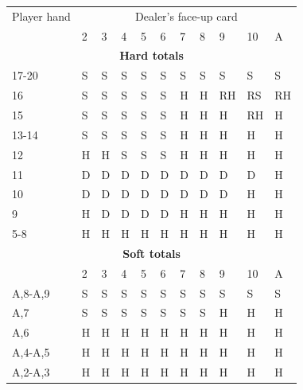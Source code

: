 \documentclass[conference]{IEEEtran}
\begin{document}
\begin{table}[ht]
\tiny
\centering
\begin{tabular}{|l|l|l|l|l|l|l|l|l|l|l|}
\hline

{Player hand} & \multicolumn{10}{c|}{Dealer's face-up card}     \\ \cline{2-11} 
                             & 2 & 3 & 4 & 5 & 6 & 7 & 8 & 9 & 10 & A \\ \hline
\multicolumn{11}{|c|}{\textbf{Hard totals}}                           \\ \hline
17-20       								 & S & S & S & S & S & S & S & S & S & S  \\ \hline
16                           & S & S & S & S & S & H & H & RH & RS & RH  \\ \hline
15                           & S & S & S & S & S & H & H & H & RH & H  \\ \hline
13-14                        & S & S & S & S & S & H & H & H & H & H  \\ \hline
12                           & H & H & S & S & S & H & H & H & H & H  \\ \hline
11                           & D & D & D & D & D & D & D & D & D & H  \\ \hline
10                           & D & D & D & D & D & D & D & D & H & H  \\ \hline
9                            & H & D & D & D & D & H & H & H & H & H  \\ \hline
5-8                          & H & H & H & H & H & H & H & H & H & H  \\ \hline

\multicolumn{11}{|c|}{\textbf{Soft totals}}                           \\ \hline
                             & 2 & 3 & 4 & 5 & 6 & 7 & 8 & 9 & 10 & A \\ \hline
A,8-A,9                      & S & S & S & S & S & S & S & S & S & S  \\ \hline
A,7                          & S & S & S & S & S & S & S & H & H & H  \\ \hline
A,6                          & H & H & H & H & H & H & H & H & H & H  \\ \hline
A,4-A,5                      & H & H & H & H & H & H & H & H & H & H  \\ \hline
A,2-A,3                      & H & H & H & H & H & H & H & H & H & H  \\ \hline


\end{tabular}
\end{table}
\end{document}
